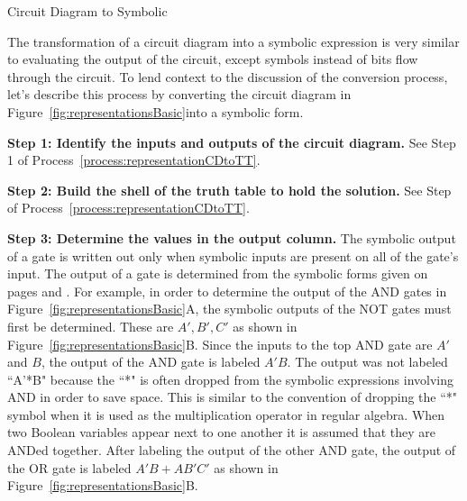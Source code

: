 \begin{process}{Circuit Diagram to Symbolic}
\label{process:representationdCdToSym}

The transformation of a circuit diagram into a symbolic expression
is very similar to evaluating the output of the circuit, except symbols
instead of bits flow through the circuit.  To lend context to the discussion
of the conversion process, let's describe this process by converting the
circuit diagram in Figure~\ref{fig:representationsBasic}into a symbolic form.

\textbf{Step 1:  Identify the inputs and outputs of the circuit diagram.}
See Step 1 of Process~\ref{process:representationCDtoTT}.

\textbf{Step 2: Build the shell of the truth table to hold the solution. }
See Step of Process~\ref{process:representationCDtoTT}.

\textbf{Step 3: Determine the values in the output column. }
The symbolic output of a gate is written out only when symbolic inputs
are present on all of the
gate's input.  The output of a gate is determined from the symbolic forms
given on pages \pageref{page:elf1} and \pageref{page:elf2}.
For example, in
order to determine the output of the AND gates in Figure~\ref{fig:representationsBasic}A, the
symbolic outputs of the NOT gates must first be determined.  These are
$A', B', C'$ as shown in Figure~\ref{fig:representationsBasic}B.
Since the inputs to the top AND gate are $A'$ and $B$, the output of the AND
gate is labeled $A'B$.  The output was not labeled ``A'*B" because the
``*" is often dropped from the symbolic expressions involving AND
in order to save space.  This is similar to the convention
of dropping the ``*" symbol when it is used
as the multiplication operator in regular algebra.  When two Boolean
variables appear next to one another it is assumed that they are ANDed together.
After labeling the output of the other AND gate, the output of the OR gate
is labeled $A'B + AB'C'$ as shown in Figure~\ref{fig:representationsBasic}B.

{\setlength{\fboxsep}{0pt}
\centering
{}
\par}\vspace{0.2cm}

\end{process}

